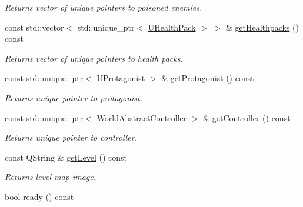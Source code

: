 \begin{DoxyCompactItemize}
\begin{DoxyCompactList}\small\item\em Returns vector of unique pointers to poisoned enemies. \end{DoxyCompactList}\item 
const std\+::vector$<$ std\+::unique\+\_\+ptr$<$ \hyperlink{classUHealthPack}{U\+Health\+Pack} $>$ $>$ \& \hyperlink{classWorldModel_a81a07a89bb6f67371553656b1780f54d}{get\+Healthpacks} () const \hypertarget{classWorldModel_a81a07a89bb6f67371553656b1780f54d}{}\label{classWorldModel_a81a07a89bb6f67371553656b1780f54d}

\begin{DoxyCompactList}\small\item\em Returns vector of unique pointers to health packs. \end{DoxyCompactList}\item 
const std\+::unique\+\_\+ptr$<$ \hyperlink{classUProtagonist}{U\+Protagonist} $>$ \& \hyperlink{classWorldModel_ae77f38af10f91c3ce963633530f0644a}{get\+Protagonist} () const \hypertarget{classWorldModel_ae77f38af10f91c3ce963633530f0644a}{}\label{classWorldModel_ae77f38af10f91c3ce963633530f0644a}

\begin{DoxyCompactList}\small\item\em Returns unique pointer to protagonist. \end{DoxyCompactList}\item 
const std\+::unique\+\_\+ptr$<$ \hyperlink{classWorldAbstractController}{World\+Abstract\+Controller} $>$ \& \hyperlink{classWorldModel_a7cf1b1a42990ab40ccd638ae868f5f21}{get\+Controller} () const \hypertarget{classWorldModel_a7cf1b1a42990ab40ccd638ae868f5f21}{}\label{classWorldModel_a7cf1b1a42990ab40ccd638ae868f5f21}

\begin{DoxyCompactList}\small\item\em Returns unique pointer to controller. \end{DoxyCompactList}\item 
const Q\+String \& \hyperlink{classWorldModel_a1f4957f65c7b044dffe4d4c5e6886438}{get\+Level} () const \hypertarget{classWorldModel_a1f4957f65c7b044dffe4d4c5e6886438}{}\label{classWorldModel_a1f4957f65c7b044dffe4d4c5e6886438}

\begin{DoxyCompactList}\small\item\em Returns level map image. \end{DoxyCompactList}\item 
bool \hyperlink{classWorldModel_a1ccf488139cdbfa6a25262d01a0401d5}{ready} () const \hypertarget{classWorldModel_a1ccf488139cdbfa6a25262d01a0401d5}{}\label{classWorldModel_a1ccf488139cdbfa6a25262d01a0401d5}


\end{DoxyCompactItemize}
